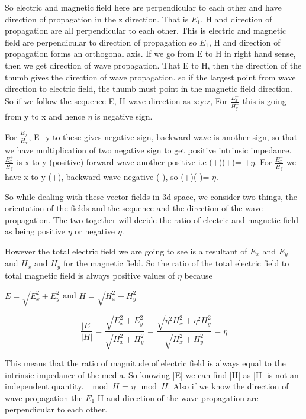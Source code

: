 So electric and magnetic field here are perpendicular to each other and have direction of propagation in the z direction. That is $E_{1}$, H and direction of propagation are all perpendicular to each other. This is electric and magnetic field are perpendicular to direction of propagation so $E_{1}$, H and direction of propagation forms an orthogonal axis. If we go from E to H in right hand sense, then we get direction of wave propagation. That E to H, then the direction of the thumb gives the direction of wave propagation. so if the largest point from wave direction to electric field, the thumb must point in the magnetic field direction. So if we follow the sequence E, H wave direction as x:y:z, For $\frac{E_x^+}{H_y^+}$ this is going from y to x and hence $\eta$ is negative sign.

For $\frac{E_y^-}{H_x}$, E_y to these gives negative sign, backward wave is another sign, so that we have multiplication of two negative sign to get positive intrinsic impedance. $\frac{E_x^+}{H_y}$ is x to y (positive) forward wave another positive i.e (+)(+)= +$\eta$. For $\frac{E_x^-}{H_y}$ we have x to y (+), backward wave negative (-), so (+)(-)=-$\eta$.

So while dealing with these vector fields in 3d space, we consider two things, the orientation of the fields and the sequence and the direction of the wave propagation. The two together will decide the ratio of electric and magnetic field as being positive $\eta$ or negative $\eta$.

However the total electric field we are going to see is a resultant of $E_x$ and $E_y$ and $H_x$ and $H_y$ for the magnetic field. So the ratio of the total electric field to total magnetic field is always positive values of $\eta$ because
\begin{center}
$E = \sqrt{E_x^2 + E_y^2}$ and $H = \sqrt{H_x^2 + H_y^2}$
\end{center}
\begin{dmath*}
\frac{|E|}{|H|}=\frac{\sqrt{E_x^2 + E_y^2}}{\sqrt{H_x^2 + H_y^2}} = \frac{\sqrt{\eta ^2H_x^2 + \eta ^2H_y^2}}{\sqrt{H_x^2 + H_y^2}}=\eta
\end{dmath*}

This means that the ratio of magnitude of electric field is always equal to the intrinsic impedance of the media. So knowing |E| we can find |H| as |H| is not an independent quantity. $\mod H$ = $\eta\mod H$. Also if we know the direction of wave propagation the $E_{1}$ H and direction of the wave propagation are perpendicular to each other.

